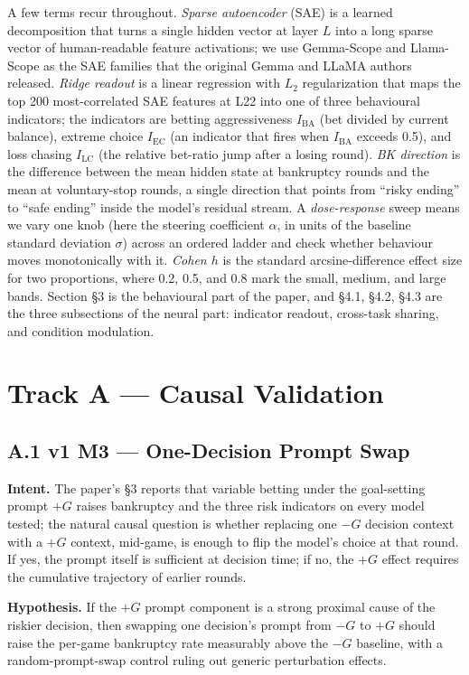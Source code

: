 \documentclass[11pt,a4paper]{article}
\begin{document}
A few terms recur throughout. \emph{Sparse autoencoder} (SAE) is a learned decomposition that turns a single hidden vector at layer $L$ into a long sparse vector of human-readable feature activations; we use Gemma-Scope and Llama-Scope as the SAE families that the original Gemma and LLaMA authors released. \emph{Ridge readout} is a linear regression with $L_2$ regularization that maps the top 200 most-correlated SAE features at L22 into one of three behavioural indicators; the indicators are betting aggressiveness $I_\text{BA}$ (bet divided by current balance), extreme choice $I_\text{EC}$ (an indicator that fires when $I_\text{BA}$ exceeds 0.5), and loss chasing $I_\text{LC}$ (the relative bet-ratio jump after a losing round). \emph{BK direction} is the difference between the mean hidden state at bankruptcy rounds and the mean at voluntary-stop rounds, a single direction that points from ``risky ending'' to ``safe ending'' inside the model's residual stream. A \emph{dose-response} sweep means we vary one knob (here the steering coefficient $\alpha$, in units of the baseline standard deviation $\sigma$) across an ordered ladder and check whether behaviour moves monotonically with it. \emph{Cohen $h$} is the standard arcsine-difference effect size for two proportions, where 0.2, 0.5, and 0.8 mark the small, medium, and large bands. Section \S3 is the behavioural part of the paper, and \S4.1, \S4.2, \S4.3 are the three subsections of the neural part: indicator readout, cross-task sharing, and condition modulation.

\section*{Track A --- Causal Validation}

\subsection*{A.1 v1 M3 --- One-Decision Prompt Swap}

\textbf{Intent.} The paper's \S3 reports that variable betting under the goal-setting prompt $+G$ raises bankruptcy and the three risk indicators on every model tested; the natural causal question is whether replacing one $-G$ decision context with a $+G$ context, mid-game, is enough to flip the model's choice at that round. If yes, the prompt itself is sufficient at decision time; if no, the $+G$ effect requires the cumulative trajectory of earlier rounds.

\textbf{Hypothesis.} If the $+G$ prompt component is a strong proximal cause of the riskier decision, then swapping one decision's prompt from $-G$ to $+G$ should raise the per-game bankruptcy rate measurably above the $-G$ baseline, with a random-prompt-swap control ruling out generic perturbation effects.
\end{document}
